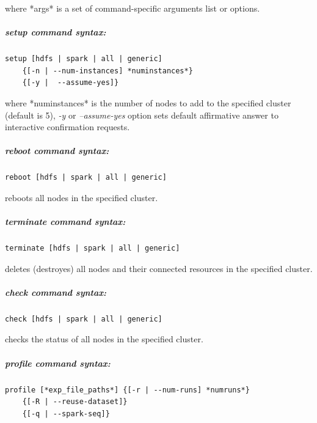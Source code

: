 where *args* is a set of command-specific arguments list or options.

\hypertarget{setup-command-syntax}{%
\subparagraph{\texorpdfstring{\emph{setup} command
		syntax:}{setup command syntax:}}\label{setup-command-syntax}}

\begin{verbatim}
setup [hdfs | spark | all | generic] 
    {[-n | --num-instances] *numinstances*} 
    {[-y |  --assume-yes]}
\end{verbatim}

where *numinstances* is the number of nodes to add to the specified
cluster (default is 5), \emph{-y} or \emph{--assume-yes} option sets
default affirmative answer to interactive confirmation requests.

\hypertarget{reboot-command-syntax}{%
\subparagraph{\texorpdfstring{\emph{reboot} command
		syntax:}{reboot command syntax:}}\label{reboot-command-syntax}}

\begin{verbatim}
reboot [hdfs | spark | all | generic]
\end{verbatim}

reboots all nodes in the specified cluster.

\hypertarget{terminate-command-syntax}{%
\subparagraph{\texorpdfstring{\emph{terminate} command
		syntax:}{terminate command syntax:}}\label{terminate-command-syntax}}

\begin{verbatim}
terminate [hdfs | spark | all | generic]
\end{verbatim}

deletes (destroyes) all nodes and their connected resources in the
specified cluster.

\hypertarget{check-command-syntax}{%
\subparagraph{\texorpdfstring{\emph{check} command
		syntax:}{check command syntax:}}\label{check-command-syntax}}

\begin{verbatim}
check [hdfs | spark | all | generic]
\end{verbatim}

checks the status of all nodes in the specified cluster.

\hypertarget{profile-command-syntax}{%
\subparagraph{\texorpdfstring{\emph{profile} command
		syntax:}{profile command syntax:}}\label{profile-command-syntax}}

\begin{verbatim}
profile [*exp_file_paths*] {[-r | --num-runs] *numruns*} 
    {[-R | --reuse-dataset]} 
    {[-q | --spark-seq]}      
\end{verbatim}


